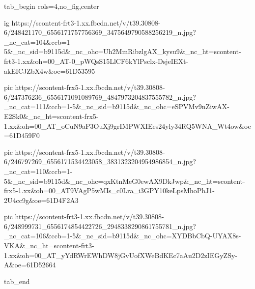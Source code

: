  
 
 
 
 


\ifcmt
  tab_begin cols=4,no_fig,center

    ig https://scontent-frt3-1.xx.fbcdn.net/v/t39.30808-6/248421170_6556171757756369_3475649790588256219_n.jpg?_nc_cat=104&ccb=1-5&_nc_sid=b9115d&_nc_ohc=Uh2MmRibzlgAX_kysu9&_nc_ht=scontent-frt3-1.xx&oh=00_AT-0_pWQsS15LlCF6kYlPsclx-DsjeIEXt-akEICJZbX4w&oe=61D53595

     pic https://scontent-frx5-1.xx.fbcdn.net/v/t39.30808-6/247376236_6556171091089769_4847973204837555782_n.jpg?_nc_cat=111&ccb=1-5&_nc_sid=b9115d&_nc_ohc=eSPVMv9nZiwAX-E2Sk0&_nc_ht=scontent-frx5-1.xx&oh=00_AT_oCuN9aP3OuXj9grIMPWXIEes24yly34RQ5WNA_Wt4ow&oe=61D459F0 

     pic https://scontent-frx5-1.xx.fbcdn.net/v/t39.30808-6/246797269_6556171534423058_3831323204954986854_n.jpg?_nc_cat=110&ccb=1-5&_nc_sid=b9115d&_nc_ohc=qxKtnMeG0ewAX9DkJwp&_nc_ht=scontent-frx5-1.xx&oh=00_AT9VAgP5wMIs_c0Lra_i3GPY10keLpsMhoPhJ1-2U4cc9g&oe=61D4F2A3

     pic https://scontent-frt3-1.xx.fbcdn.net/v/t39.30808-6/248999731_6556174854422726_2948338290861755781_n.jpg?_nc_cat=106&ccb=1-5&_nc_sid=b9115d&_nc_ohc=XYDBbCbQ-UYAX8s-VKA&_nc_ht=scontent-frt3-1.xx&oh=00_AT_yYdRWrEWhDW8jGvUofXWeBdKEc7aAu2D2zIEGyZSy-A&oe=61D52664

  tab_end
\fi
